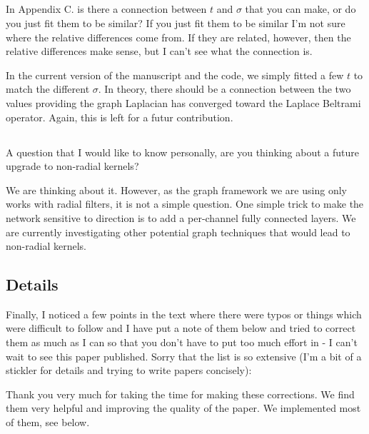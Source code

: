 \documentclass[12pt,a4paper]{article}
\newcommand{\1}{\b{1}}              %
\newcommand{\0}{\b{0}}              %
\begin{document}
\subsection{}
\begin{mdframed}[style=comment]
In Appendix C. is there a connection between $t$ and $\sigma$ that you can make, or do you just fit them to be similar? If you just fit them to be similar I'm not sure where the relative differences come from. If they are related, however, then the relative differences make sense, but I can't see what the connection is.
\end{mdframed}

In the current version of the manuscript and the code, we simply fitted a few $t$ to match the different $\sigma$. In theory, there should be a connection between the two values providing the graph Laplacian has converged toward the Laplace Beltrami operator. Again, this is left for a futur contribution.

\subsection{}
\begin{mdframed}[style=comment]
A question that I would like to know personally, are you thinking about a future upgrade to non-radial kernels?
\end{mdframed}
We are thinking about it. However, as the graph framework we are using only works with radial filters, it is not a simple question. One simple trick to make the network sensitive to direction is to add a per-channel fully connected layers. We are currently investigating other potential graph techniques that would lead to non-radial kernels.


\subsection{Details}
\begin{mdframed}[style=comment]
Finally, I noticed a few points in the text where there were typos or things which were difficult to follow and I have put a note of them below and tried to correct them as much as I can so that you don't have to put too much effort in - I can't wait to see this paper published. Sorry that the list is so extensive (I'm a bit of a stickler for details and trying to write papers concisely):
\end{mdframed}
Thank you very much for taking the time for making these corrections. We find them very helpful and improving the quality of the paper.
We implemented most of them, see below.
\end{document}
